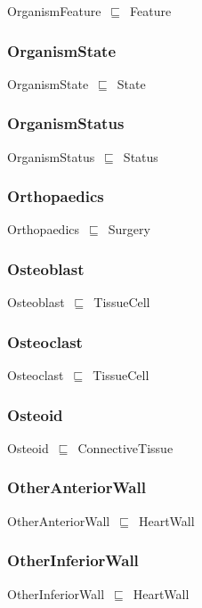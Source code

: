 \documentclass{article}
\begin{document}
OrganismFeature~\ensuremath{\sqsubseteq}~Feature~

\subsubsection*{OrganismState}

OrganismState~\ensuremath{\sqsubseteq}~State~

\subsubsection*{OrganismStatus}

OrganismStatus~\ensuremath{\sqsubseteq}~Status~

\subsubsection*{Orthopaedics}

Orthopaedics~\ensuremath{\sqsubseteq}~Surgery~

\subsubsection*{Osteoblast}

Osteoblast~\ensuremath{\sqsubseteq}~TissueCell~

\subsubsection*{Osteoclast}

Osteoclast~\ensuremath{\sqsubseteq}~TissueCell~

\subsubsection*{Osteoid}

Osteoid~\ensuremath{\sqsubseteq}~ConnectiveTissue~

\subsubsection*{OtherAnteriorWall}

OtherAnteriorWall~\ensuremath{\sqsubseteq}~HeartWall~

\subsubsection*{OtherInferiorWall}

OtherInferiorWall~\ensuremath{\sqsubseteq}~HeartWall~
\end{document}
